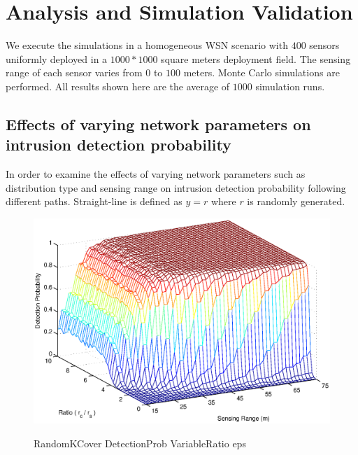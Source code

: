 \documentclass[10pt, conference, compsocconf, twocolumn]{IEEEtran}
\begin{document}
\section{Analysis and Simulation Validation} \label{sec:simulation}

We execute the simulations in a homogeneous WSN scenario with $400$
sensors uniformly deployed in a $1000 \ast 1000$ square meters
deployment field. The sensing range of each sensor
varies from $0$ to $100$ meters. Monte Carlo simulations are
performed. All results shown here are the average of $1000$
simulation runs.








\subsection{Effects of varying network parameters on intrusion detection probability}

In order to examine the effects of varying network parameters such
as distribution type and sensing range on intrusion detection probability
following different paths.  Straight-line is defined as $y = r$ where $r$ is randomly
generated.\\




\begin{figure}
  \includegraphics[width=3.2 in]{RandomKCover_DetectionProb_VariableRatio.eps}\\
  \caption{RandomKCover DetectionProb VariableRatio eps}\label{RandomKCover_DetectionProb_VariableRatio.eps}
\end{figure}
\end{document}
